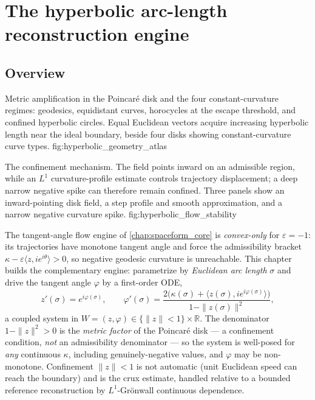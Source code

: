 \chapter{The hyperbolic arc-length reconstruction engine}
\label{chap:hyperbolic_arclength}


\section{Overview}

  {Metric amplification in the Poincaré disk and the four constant-curvature
   regimes: geodesics, equidistant curves, horocycles at the escape threshold,
   and confined hyperbolic circles.}
  {Equal Euclidean vectors acquire increasing hyperbolic length near the ideal
   boundary, beside four disks showing constant-curvature curve types.}
  {fig:hyperbolic_geometry_atlas}

  {The confinement mechanism. The field points inward on an admissible region,
   while an $L^1$ curvature-profile estimate controls trajectory displacement;
   a deep narrow negative spike can therefore remain confined.}
  {Three panels show an inward-pointing disk field, a step profile and smooth
   approximation, and a narrow negative curvature spike.}
  {fig:hyperbolic_flow_stability}

The tangent-angle flow engine of \cref{chap:spaceform_core} is
\emph{convex-only} for $\varepsilon=-1$: its trajectories have monotone tangent
angle and force the admissibility bracket
$\kappa-\varepsilon\langle z,ie^{i\theta}\rangle>0$, so negative geodesic
curvature is unreachable. This chapter builds the complementary engine:
parametrize by \emph{Euclidean arc length} $\sigma$ and drive the tangent angle
$\varphi$ by a first-order ODE,
\[
  z'(\sigma) = e^{i\varphi(\sigma)}, \qquad
  \varphi'(\sigma) =
  \frac{2\bigl(\kappa(\sigma) + \langle z(\sigma),
    i e^{i\varphi(\sigma)}\rangle\bigr)}{1 - \|z(\sigma)\|^{2}},
\]
a coupled system in $W=(z,\varphi)\in\{\|z\|<1\}\times\mathbb R$. The
denominator $1-\|z\|^2>0$ is the \emph{metric factor} of the Poincar\'e disk —
a confinement condition, \emph{not} an admissibility denominator — so the
system is well-posed for \emph{any} continuous $\kappa$, including
genuinely-negative values, and $\varphi$ may be non-monotone. Confinement
$\|z\|<1$ is not automatic (unit Euclidean speed can reach the boundary) and is
the crux estimate, handled relative to a bounded reference reconstruction by
$L^1$-Grönwall continuous dependence.

